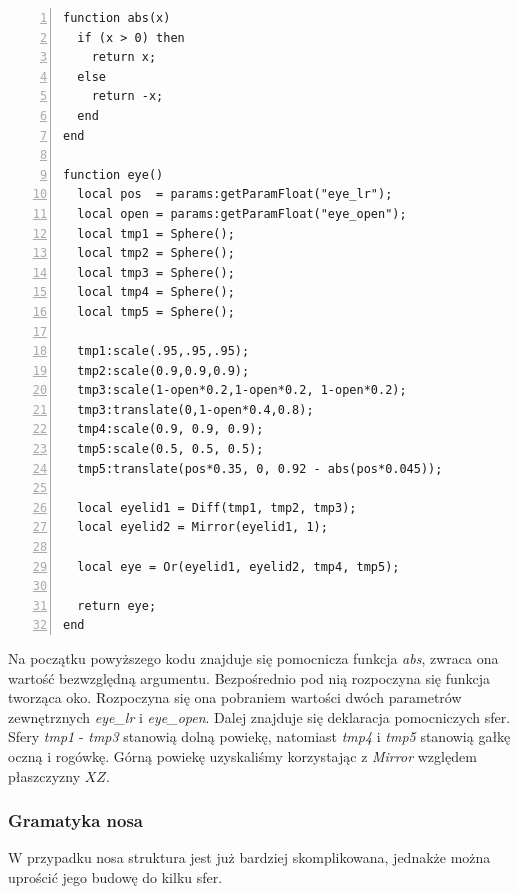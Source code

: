 {
\small
\begin{lstlisting}[numbers=left,frame=single,numberstyle=\tiny,backgroundcolor=\color{code_back},breaklines=true]
function abs(x)
  if (x > 0) then
    return x;
  else
    return -x;
  end
end

function eye()
  local pos  = params:getParamFloat("eye_lr");
  local open = params:getParamFloat("eye_open");
  local tmp1 = Sphere();
  local tmp2 = Sphere();
  local tmp3 = Sphere();
  local tmp4 = Sphere();
  local tmp5 = Sphere();

  tmp1:scale(.95,.95,.95);
  tmp2:scale(0.9,0.9,0.9);
  tmp3:scale(1-open*0.2,1-open*0.2, 1-open*0.2);
  tmp3:translate(0,1-open*0.4,0.8);
  tmp4:scale(0.9, 0.9, 0.9);
  tmp5:scale(0.5, 0.5, 0.5);
  tmp5:translate(pos*0.35, 0, 0.92 - abs(pos*0.045));

  local eyelid1 = Diff(tmp1, tmp2, tmp3);
  local eyelid2 = Mirror(eyelid1, 1);

  local eye = Or(eyelid1, eyelid2, tmp4, tmp5);

  return eye;
end
\end{lstlisting}
}

Na początku powyższego kodu znajduje się pomocnicza funkcja {\em abs}, zwraca
ona wartość bezwzględną argumentu. Bezpośrednio pod nią rozpoczyna się funkcja
tworząca oko. Rozpoczyna się ona pobraniem wartości dwóch parametrów zewnętrznych {\em
eye\_lr} i {\em eye\_open}. Dalej znajduje się deklaracja pomocniczych sfer.
Sfery {\em tmp1} - {\em tmp3} stanowią dolną powiekę, natomiast {\em tmp4} i
{\em tmp5} stanowią gałkę oczną i rogówkę. Górną powiekę uzyskaliśmy korzystając
z {\em Mirror} względem płaszczyzny $XZ$.

\subsubsection{Gramatyka nosa}
W przypadku nosa struktura jest już bardziej skomplikowana, jednakże
można uprościć jego budowę do kilku sfer.

